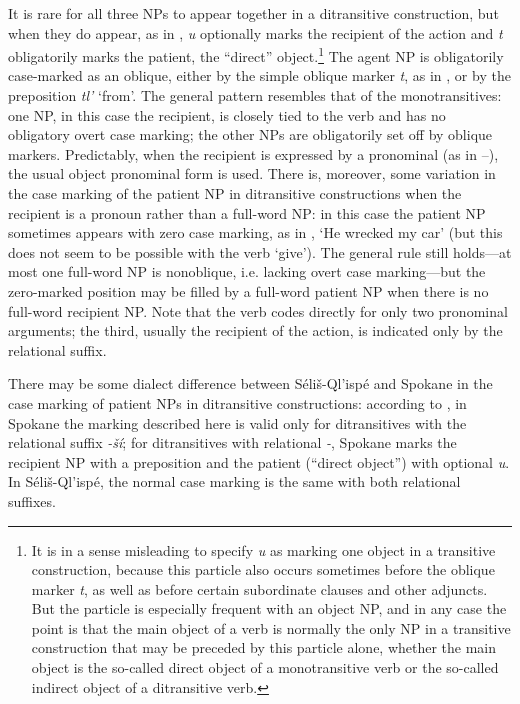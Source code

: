\documentclass[output=paper,colorlinks,citecolor=brown]{langscibook}
\begin{document}
  It is rare for all three NPs to appear together in a ditransitive
  construction, but when they do appear, as in , \emph{{\textltilde}u} optionally marks the recipient of the action and
  \emph{t} obligatorily marks the patient, the ``direct''
  object.\footnote{It is in a sense misleading to specify \emph{{\textltilde}u} as marking one object in a transitive
  construction, because this particle also occurs sometimes before
  the oblique marker \emph{t}, as well as before certain subordinate
  clauses and other adjuncts.  But the particle is especially
  frequent with an object NP, and in any case the point is that the
  main object of a verb is normally the only NP in a transitive
  construction that may be preceded by this particle alone, whether
  the main object is the so-called direct object of a monotransitive
  verb or the so-called indirect object of a ditransitive verb.  }
  The agent NP is obligatorily case-marked as an oblique, either by
  the simple oblique marker \emph{t}, as in , or by the preposition
  \emph{tl'} `from'.  The general pattern resembles that of the
  monotransitives: one NP, in this case the recipient, is closely
  tied to the verb and has no obligatory overt case marking; the
  other NPs are obligatorily set off by oblique markers.
  Predictably, when the recipient is expressed by a pronominal (as in
  --), the usual object pronominal form is used.  There is,
  moreover, some variation in the case marking of the patient NP in
  ditransitive constructions when the recipient is a pronoun rather
  than a full-word NP: in this case the patient NP sometimes appears
  with zero case marking, as in , `He wrecked my car' (but this
  does not seem to be possible with the verb `give').  The general
  rule still holds---at most one full-word NP is nonoblique, i.e.
  lacking overt case marking---but the zero-marked position may be
  filled by a full-word patient NP when there is no full-word
  recipient NP.  Note that the verb codes directly for only two
  pronominal arguments; the third, usually the recipient of the
  action, is indicated only by the relational suffix.


  There may be some dialect difference between S\'eli\v{s}-Ql'isp\'e
  and Spokane in the case marking of patient NPs in ditransitive
  constructions: according to \citet[24]{Carlson:1980}, in Spokane the
  marking described here is valid only for ditransitives with the
  relational suffix \emph{-\v{s}\'i}; for ditransitives with
  relational \emph{-{\textltilde}}, Spokane marks the recipient NP
  with a preposition and the patient (``direct object'') with
  optional \emph{{\textltilde}u}.  In S\'eli\v{s}-Ql'isp\'e, the
  normal case marking is the same with both relational suffixes.
\end{document}
